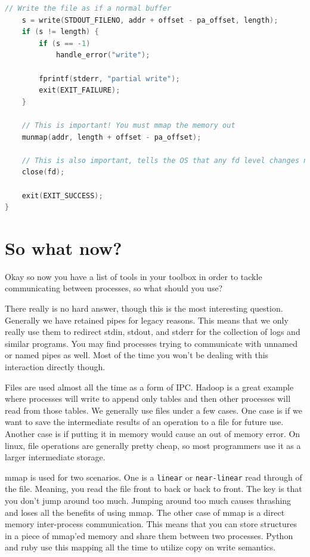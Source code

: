 \begin{lstlisting}[language=C]
    // Write the file as if a normal buffer
    s = write(STDOUT_FILENO, addr + offset - pa_offset, length);
    if (s != length) {
        if (s == -1)
            handle_error("write");

        fprintf(stderr, "partial write");
        exit(EXIT_FAILURE);
    }

    // This is important! You must mmap the memory out
    munmap(addr, length + offset - pa_offset);

    // This is also important, tells the OS that any fd level changes need to be addressed
    close(fd);

    exit(EXIT_SUCCESS);
}
 \end{lstlisting}

\section{So what now?}

Okay so now you have a list of tools in your toolbox in order to tackle communicating between processes, so what should you use?

There really is no hard answer, though this is the most interesting question. Generally we have retained pipes for legacy reasons. This means that we only really use them to redirect stdin, stdout, and stderr for the collection of logs and similar programs. You may find processes trying to communicate with unnamed or named pipes as well. Most of the time you won't be dealing with this interaction directly though.

Files are used almost all the time as a form of IPC. Hadoop is a great example where processes will write to append only tables and then other processes will read from those tables. We generally use files under a few cases. One case is if we want to save the intermediate results of an operation to a file for future use. Another case is if putting it in memory would cause an out of memory error. On linux, file operations are generally pretty cheap, so most programmers use it as a larger intermediate storage.

mmap is used for two scenarios. One is a \texttt{linear} or \texttt{near-linear} read through of the file. Meaning, you read the file front to back or back to front. The key is that you don't jump around too much. Jumping around too much causes thrashing and loses all the benefits of using mmap. The other case of mmap is a direct memory inter-process communication. This means that you can store structures in a piece of mmap'ed memory and share them between two processes. Python and ruby use this mapping all the time to utilize copy on write semantics.

